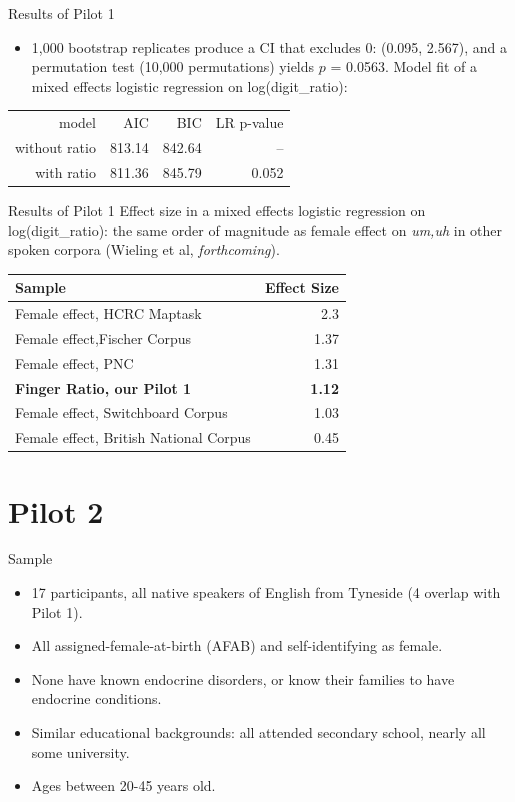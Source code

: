 \documentclass[hyperref={pdfpagelabels=false}]{beamer}
\begin{document}
\begin{frame}{Results of Pilot 1}
\begin{itemize}
\item 1,000 bootstrap replicates produce a CI that excludes 0: (0.095,  2.567), and a permutation test (10,000 permutations) yields $p$ = 0.0563. Model fit of a mixed effects logistic regression on log(digit\_ratio):
\end{itemize}
\begin{center}
\begin{tabular}{rrrr}
\toprule
	model & AIC & BIC & LR p-value\\
	\cmidrule{2-4}
without ratio & 813.14 & 842.64 & -- \\
with ratio &  811.36 & 845.79 & 0.052\\
\bottomrule
\end{tabular}
\end{center}

\end{frame}


\begin{frame}{Results of Pilot 1}
\noindent Effect size in a mixed effects logistic regression on log(digit\_ratio): the same order of magnitude as female effect on \textsl{um,uh} in other spoken corpora (Wieling et al, \textsl{forthcoming}).
\begin{center}
\begin{tabular}{l r}
\toprule
\textbf{Sample} & \textbf{Effect Size}\\
\midrule
Female effect, HCRC Maptask & 2.3\\
Female effect,Fischer Corpus & 1.37\\
Female effect, PNC & 1.31\\
\textbf{Finger Ratio, our Pilot 1} & \textbf{1.12}\\
Female effect, Switchboard Corpus & 1.03\\
Female effect, British National Corpus & 0.45\\
\bottomrule
\end{tabular}
\end{center}

\end{frame}


\section{Pilot 2}


\begin{frame}{Sample}
\begin{itemize}
	\item 17 participants, all native speakers of English from Tyneside (4 overlap with Pilot 1).
	\item All assigned-female-at-birth (AFAB) and self-identifying as female.
	\item None have known endocrine disorders, or know their families to have endocrine conditions.
	\item Similar educational backgrounds: all attended secondary school, nearly all some university.
	\item Ages between 20-45 years old.
\end{itemize}
\end{frame}
\end{document}
